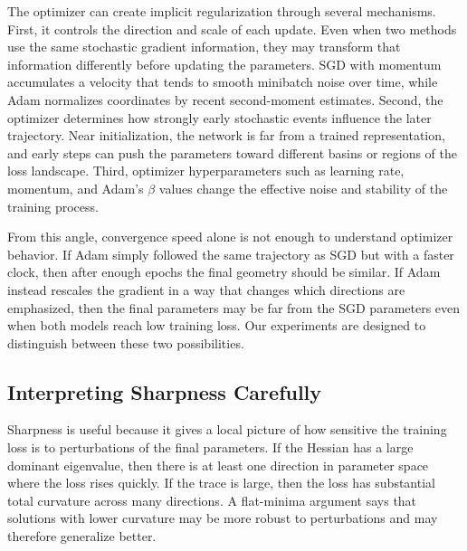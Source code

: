 \documentclass[11pt]{article}
\begin{document}
The optimizer can create implicit regularization through several mechanisms. First, it controls the direction and scale of each update. Even when two methods use the same stochastic gradient information, they may transform that information differently before updating the parameters. SGD with momentum accumulates a velocity that tends to smooth minibatch noise over time, while Adam normalizes coordinates by recent second-moment estimates. Second, the optimizer determines how strongly early stochastic events influence the later trajectory. Near initialization, the network is far from a trained representation, and early steps can push the parameters toward different basins or regions of the loss landscape. Third, optimizer hyperparameters such as learning rate, momentum, and Adam's $\beta$ values change the effective noise and stability of the training process.

From this angle, convergence speed alone is not enough to understand optimizer behavior. If Adam simply followed the same trajectory as SGD but with a faster clock, then after enough epochs the final geometry should be similar. If Adam instead rescales the gradient in a way that changes which directions are emphasized, then the final parameters may be far from the SGD parameters even when both models reach low training loss. Our experiments are designed to distinguish between these two possibilities.

\subsection{Interpreting Sharpness Carefully}

Sharpness is useful because it gives a local picture of how sensitive the training loss is to perturbations of the final parameters. If the Hessian has a large dominant eigenvalue, then there is at least one direction in parameter space where the loss rises quickly. If the trace is large, then the loss has substantial total curvature across many directions. A flat-minima argument says that solutions with lower curvature may be more robust to perturbations and may therefore generalize better.
\end{document}
